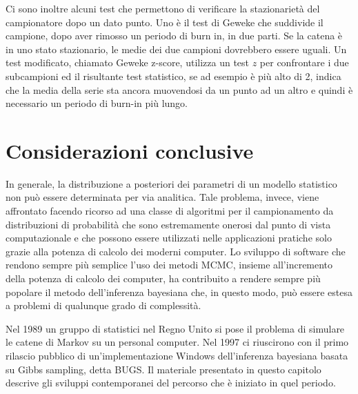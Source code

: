 \documentclass[
]{memoir}
\begin{document}
Ci sono inoltre alcuni test che permettono di verificare la stazionarietà del campionatore dopo un dato punto. Uno è il test di Geweke che suddivide il campione, dopo aver rimosso un periodo di burn in, in due parti. Se la catena è in uno stato stazionario, le medie dei due campioni dovrebbero essere uguali. Un test modificato, chiamato Geweke z-score, utilizza un test \(z\) per confrontare i due subcampioni ed il risultante test statistico, se ad esempio è più alto di 2, indica che la media della serie sta ancora muovendosi da un punto ad un altro e quindi è necessario un periodo di burn-in più lungo.

\hypertarget{considerazioni-conclusive}{%
\section*{Considerazioni conclusive}\label{considerazioni-conclusive}}

In generale, la distribuzione a posteriori dei parametri di un modello statistico non può essere determinata per via analitica. Tale problema, invece, viene affrontato facendo ricorso ad una classe di algoritmi per il campionamento da distribuzioni di probabilità che sono estremamente onerosi dal punto di vista computazionale e che possono essere utilizzati nelle applicazioni pratiche solo grazie alla potenza di calcolo dei moderni computer. Lo sviluppo di software che rendono sempre più semplice l'uso dei metodi MCMC, insieme all'incremento della potenza di calcolo dei computer, ha contribuito a rendere sempre più popolare il metodo dell'inferenza bayesiana che, in questo modo, può essere estesa a problemi di qualunque grado di complessità.

Nel 1989 un gruppo di statistici nel Regno Unito si pose il problema di simulare le catene di Markov su un personal computer. Nel 1997 ci riuscirono con il primo rilascio pubblico di un'implementazione Windows dell'inferenza bayesiana basata su Gibbs sampling, detta BUGS. Il materiale presentato in questo capitolo descrive gli sviluppi contemporanei del percorso che è iniziato in quel periodo.

\hypertarget{appendix-appendix}{%
\appendix}


  
\end{document}
